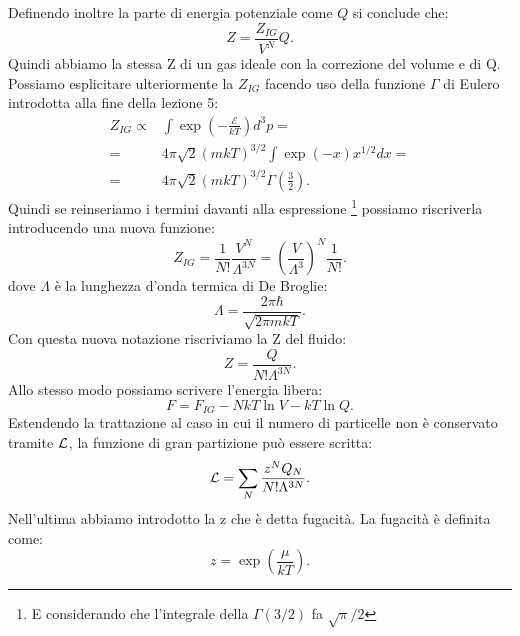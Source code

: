 Definendo inoltre la parte di energia potenziale come $Q$ si conclude che:
\[
	Z = \frac{Z_{IG}}{V^{N}}Q
.\] 
Quindi abbiamo la stessa Z di un gas ideale con la correzione del volume e di Q. \\
Possiamo esplicitare ulteriormente la $Z_{IG}$ facendo uso della funzione $\Gamma$ di Eulero introdotta alla fine della lezione 5:
\begin{align}
	Z_{IG} \propto& \int \exp\left( -\frac{\mathcal{E}}{kT} \right) d^3p = \\
	=& 4\pi\sqrt{2} \left( mkT \right) ^{3 /2} \int \exp\left( -x \right) x^{1 /2}dx=\\
	=&4\pi\sqrt{2} \left( mkT \right) ^{3 /2} \Gamma\left( \frac{3}{2} \right) 
.\end{align}
Quindi se reinseriamo i termini davanti alla espressione \footnote{E considerando che l'integrale della $\Gamma\left( 3 / 2 \right)$ fa $\sqrt{\pi}/2$} possiamo riscriverla introducendo una nuova funzione:
 \[
	 Z_{IG} = \frac{1}{N!} \frac{V^{N}}{\Lambda^{3N}} = \left( \frac{V}{\Lambda^3} \right)^{N} \frac{1}{N!} 
.\] 
dove $\Lambda$ è la lunghezza d'onda termica di De Broglie: 
\[
	\Lambda = \frac{2\pi \hbar }{\sqrt{2\pi m kT} }
.\] 
Con questa nuova notazione riscriviamo la Z del fluido:
\[
	Z = \frac{Q}{N! \Lambda^{3N}}
.\] 
Allo stesso modo possiamo scrivere l'energia libera:
\[
	F = F_{IG}- NkT \ln V - kT \ln Q
.\] 
Estendendo la trattazione al caso in cui il numero di particelle non è conservato tramite $\mathcal{L}$, la funzione di gran partizione può essere scritta:
\[
	\mathcal{L} = \sum_{N}^{} \frac{z^{N} Q_{N}}{N! \Lambda^{3N}}
.\] 
Nell'ultima abbiamo introdotto la z che è detta fugacità. La fugacità è definita come: 
\[
	z = \exp\left( \frac{\mu}{kT} \right) 
.\] 

